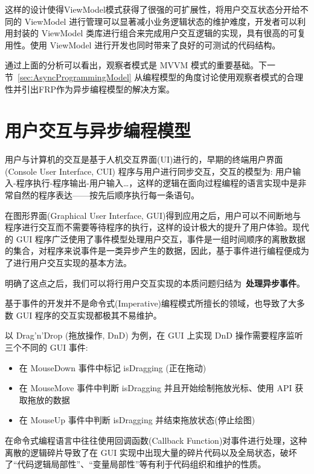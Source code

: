 这样的设计使得ViewModel模式获得了很强的可扩展性，将用户交互状态分开给不同的 ViewModel 进行管理可以显著减小业务逻辑状态的维护难度，开发者可以利用封装的 ViewModel 类库进行组合来完成用户交互逻辑的实现，具有很高的可复用性。使用 ViewModel 进行开发也同时带来了良好的可测试的代码结构。

通过上面的分析可以看出，观察者模式是 MVVM 模式的重要基础。下一节~\ref{sec:AsyncProgrammingModel} 从编程模型的角度讨论使用观察者模式的合理性并引出FRP作为异步编程模型的解决方案。

\section{用户交互与异步编程模型\label{sec:AsyncProgrammingModel}}

用户与计算机的交互是基于人机交互界面(UI)进行的，早期的终端用户界面 (Console User Interface, CUI) 程序与用户进行同步交互，交互的模型为: 用户输入-程序执行-程序输出-用户输入\ldots，这样的逻辑在面向过程编程的语言实现中是非常自然的程序表达——按先后顺序执行每一条语句。

在图形界面(Graphical User Interface, GUI)得到应用之后，用户可以不间断地与程序进行交互而不需要等待程序的执行，这样的设计极大的提升了用户体验。现代的 GUI 程序广泛使用了事件模型处理用户交互，事件是一组时间顺序的离散数据的集合，对程序来说事件是一类异步产生的数据，因此，基于事件进行编程便成为了进行用户交互实现的基本方法。

明确了这点之后，我们可以将行用户交互实现的本质问题归结为~\textbf{处理异步事件}。

基于事件的开发并不是命令式(Imperative)编程模式所擅长的领域，也导致了大多数 GUI 程序的交互实现都极其不易维护。

以 Drag'n'Drop (拖放操作, DnD) 为例\cite{Zhao2010}，在 GUI 上实现 DnD 操作需要程序监听三个不同的 GUI 事件:

\begin{itemize}
  \item 在 MouseDown 事件中标记 isDragging (正在拖动)
  \item 在 MouseMove 事件中判断 isDragging 并且开始绘制拖放光标、使用 API 获取拖放的数据
  \item 在 MouseUp 事件中判断 isDragging 并结束拖放状态(停止绘图)
\end{itemize}

在命令式编程语言中往往使用回调函数(Callback Function)对事件进行处理，这种离散的逻辑碎片导致了在 GUI 实现中出现大量的碎片代码以及全局状态，破坏了“代码逻辑局部性”、“变量局部性”等有利于代码组织和维护的性质。

